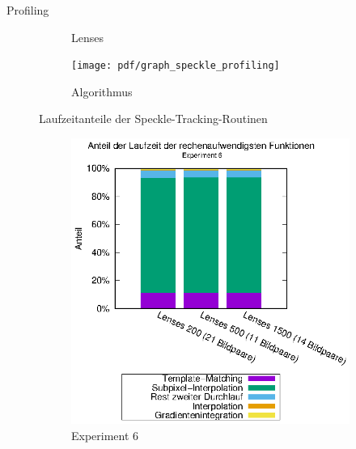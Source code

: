 \begin{frame}[allowframebreaks]{Profiling}
\begin{center}
\begin{figure}[h]
\begin{subfigure}[b]{0.45\linewidth}
				\caption{Lenses}
			\end{subfigure}
			\hspace{-0.3cm}
			\begin{subfigure}[b]{0.19\linewidth}
				\centering
				\texttt{[image: pdf/graph\_speckle\_profiling]}
				\caption{Algorithmus}
			\end{subfigure}
			\caption{Laufzeitanteile der Speckle-Tracking-Routinen}
		\end{figure}
		
		\framebreak
		
		\begin{figure}[h]
			\begin{subfigure}[b]{0.45\linewidth}
				\centering
				\includegraphics[width=\linewidth]{pdf/slow_exp6.eps}
				\caption{Experiment 6}
			\end{subfigure}
			\begin{subfigure}[b]{0.45\linewidth}
				\centering

\end{subfigure}
\end{figure}
\end{center}
\end{frame}
